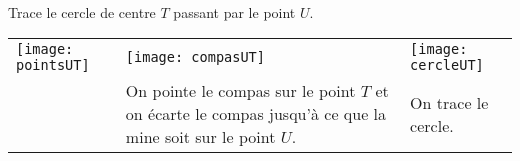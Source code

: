 \begin{methode*1}
 \begin{exemple*1} \\[0.75em]
Trace le cercle de centre $T$ passant par le point $U$. \\[0.5em]

\begin{tabularx}{\textwidth}{X|X|X}
 \texttt{[image: pointsUT]} &  \texttt{[image: compasUT]} & \texttt{[image: cercleUT]} \\ 
  & On pointe le compas sur le point $T$ et on écarte le compas jusqu'à ce que la mine soit sur le point $U$. & On trace le cercle. \\
\end{tabularx} \\

 \end{exemple*1}

\exercice %



 
\end{methode*1}




